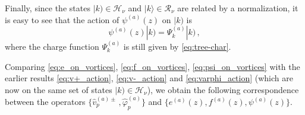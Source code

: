 \documentclass[12pt,a4paper]{article}
\renewcommand{\(}{\left(}
\renewcommand{\)}{\right)}
\renewcommand{\(}{\left(}
\renewcommand{\)}{\right)}
\begin{document}
\noindent Finally, since the states $|k)\in\mathcal{H}_{\nu}$ and $|k \rangle\in\mathcal{R}_\nu$ are related by a normalization, it is easy to see that the action of $\psi^{(a)}(z)$ on $|k)$ is
\begin{equation}\label{eq:psi_on_vortices}
\psi^{(a)}(z)|k)=\Psi^{(a)}_k|k)\,,
\end{equation}
where the charge function $\Psi^{(a)}_k$ is still given by \eqref{eq:tree-char}.


Comparing \eqref{eq:e_on_vortices}, \eqref{eq:f_on_vortices}, \eqref{eq:psi_on_vortices} with the earlier results \eqref{eq:v+_action}, \eqref{eq:v-_action} and \eqref{eq:varphi_action} (which are now on the same set of states $|k)\in \mathcal{H}_\nu$), we obtain the following correspondence between the operators $\{\hat{v}^{(a)\pm}_{p}\,, \hat{\varphi}^{(a)}_{p}  \}$ and $\{e^{(a)}(z),f^{(a)}(z),\psi^{(a)}(z)\}$.
\end{document}
